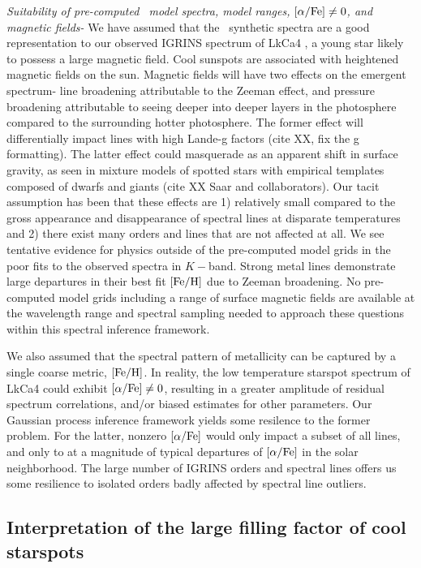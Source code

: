 \documentclass[twocolumn]{emulateapj}%
\newcommand{\name}{LkCa4 }
\begin{document}
\emph{Suitability of pre-computed \PHOENIX\ model spectra, model ranges, $[\alpha/{\rm Fe}] \neq 0$, and magnetic fields-} We have assumed that the \PHOENIX\ synthetic spectra are a good representation to our observed IGRINS spectrum of \name, a young star likely to possess a large magnetic field.  Cool sunspots are associated with heightened magnetic fields on the sun.  Magnetic fields will have two effects on the emergent spectrum- line broadening attributable to the Zeeman effect, and pressure broadening attributable to seeing deeper into deeper layers in the photosphere compared to the surrounding hotter photosphere.  The former effect will differentially impact lines with high Lande-g factors (cite XX, fix the g formatting).  The latter effect could masquerade as an apparent shift in surface gravity, as seen in mixture models of spotted stars with empirical templates composed of dwarfs and giants (cite XX Saar and collaborators).  Our tacit assumption has been that these effects are 1) relatively small compared to the gross appearance and disappearance of spectral lines at disparate temperatures and 2) there exist many orders and lines that are not affected at all.  We see tentative evidence for physics outside of the pre-computed model grids in the poor fits to the observed spectra in $K-$band.  Strong metal lines demonstrate large departures in their best fit $[{\rm Fe}/{\rm H}]$ due to Zeeman broadening.  No pre-computed model grids including a range of surface magnetic fields are available at the wavelength range and spectral sampling needed to approach these questions within this spectral inference framework.

We also assumed that the spectral pattern of metallicity can be captured by a single coarse metric, $[{\rm Fe}/{\rm H}]$.  In reality, the low temperature starspot spectrum of \name could exhibit $[\alpha/{\rm Fe}] \neq 0$, resulting in a greater amplitude of residual spectrum correlations, and/or biased estimates for other parameters.  Our Gaussian process inference framework yields some resilence to the former problem.  For the latter, nonzero $[\alpha/{\rm Fe}]$ would only impact a subset of all lines, and only to at a magnitude of typical departures of $[\alpha/{\rm Fe}]$ in the solar neighborhood.  The large number of IGRINS orders and spectral lines offers us some resilience to isolated orders badly affected by spectral line outliers.


\subsection{Interpretation of the large filling factor of cool starspots}
\end{document}
